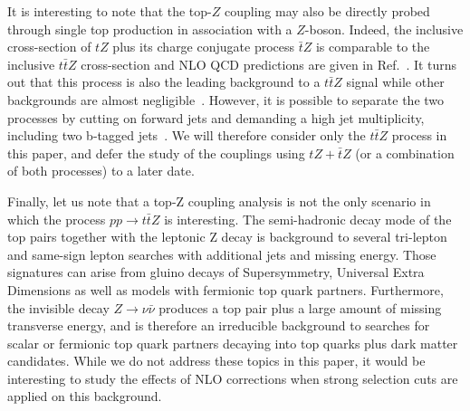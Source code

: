 \documentclass[preprint]{JHEP3} %
\def\ttbZ{t\bar{t}Z}
\begin{document}
It is interesting to note that the top-$Z$ coupling may also be directly probed through single top production in association with a $Z$-boson. 
Indeed, the inclusive cross-section of $tZ$ plus its charge conjugate process $\bar{t}Z$ is comparable to the inclusive $\ttbZ$ cross-section 
and NLO QCD predictions are given in Ref.~\cite{Campbell:2013yla}. 
It turns out that this process is also the leading background to a $\ttbZ$ signal while other backgrounds are almost negligible~\cite{Baur:2004uw}.
However, it is possible to separate the two processes by cutting on forward jets and demanding a high jet multiplicity, including two b-tagged jets~\cite{Campbell:2013yla}. 
We will therefore consider only the $\ttbZ$ process in this paper, and defer the study of the couplings using $tZ+\bar{t}Z$ (or a combination of both processes) to a later date. 



Finally, let us note that a top-Z coupling analysis is not the only scenario in which the process $pp\to\ttbZ$ is interesting. 
The semi-hadronic decay mode of the top pairs together with the leptonic Z decay is background to several tri-lepton and same-sign lepton searches with additional jets and missing energy.
Those signatures can arise from gluino decays of Supersymmetry, Universal Extra Dimensions as well as models with fermionic top quark partners. 
Furthermore, the invisible decay $Z \to \nu \bar{\nu}$ produces a top pair plus a large amount of missing transverse energy, and is therefore an irreducible background 
to searches for scalar or fermionic top quark partners decaying into top quarks plus dark matter candidates.
While we do not address these topics in this paper, it would be interesting to study the effects of NLO corrections when strong selection cuts are applied on this background.
\end{document}
